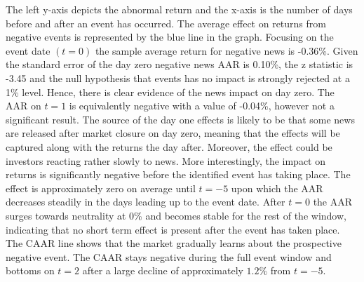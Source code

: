 The left y-axis depicts the abnormal return and the x-axis is the number of days before and after an event has occurred. The average effect on returns from negative events is represented by the blue line in the graph. 
Focusing on the event date $(t=0)$ the sample average return for negative news is -0.36\%. Given the standard error of the day zero negative news AAR is  0.10\%, the z statistic is -3.45 and the null hypothesis that events has no impact is strongly rejected at a 1\% level. Hence, there is clear evidence of the news impact on day zero. The AAR on $t=1$ is equivalently negative with a value of -0.04\%, however not a significant result. The source of the day one effects is likely to be that some news are released after market closure on day zero, meaning that the effects will be captured along with the returns the day after. Moreover, the effect could be investors reacting rather slowly to news. 
More interestingly, the impact on returns is significantly negative before the identified event has taking place. 
The effect is approximately zero on average until $t = -5$ upon which the AAR decreases steadily in the days leading up to the event date. After $t=0$ the AAR surges towards neutrality at 0\% and becomes stable for the rest of the window, indicating that no short term effect is present after the event has taken place. The CAAR line shows that the market gradually learns about the prospective negative event. 
The CAAR stays negative during the full event window and bottoms on $t=2$ after a large decline of approximately $1.2\%$ from $t=-5$. 

